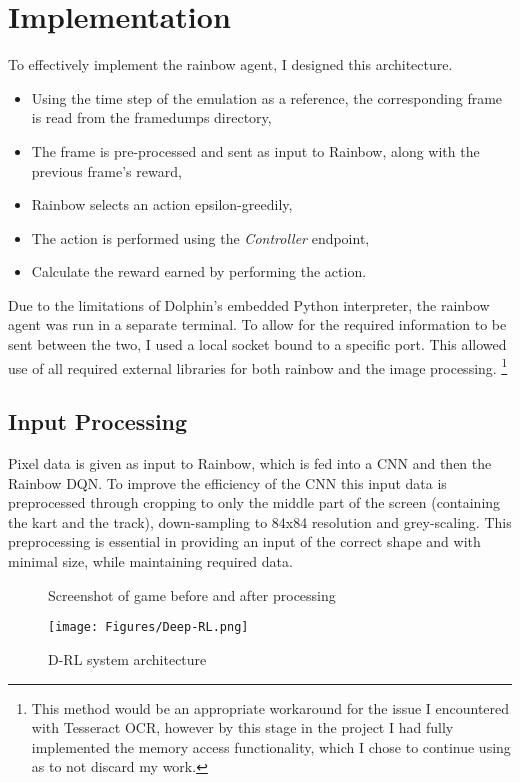 \section{Implementation}
To effectively implement the rainbow agent, I designed this architecture.
\begin{itemize}
    \item Using the time step of the emulation as a reference, the corresponding frame is read from the framedumps directory,
    \item The frame is pre-processed and sent as input to Rainbow, along with the previous frame's reward,
    \item Rainbow selects an action epsilon-greedily,
    \item The action is performed using the \textit{Controller} endpoint,
    \item Calculate the reward earned by performing the action.
\end{itemize}
Due to the limitations of Dolphin's embedded Python interpreter, the rainbow agent was run in a separate terminal. To allow for the required information to be sent between the two, I used a local socket bound to a specific port. This allowed use of all required external libraries for both rainbow and the image processing. \footnote{This method would be an appropriate workaround for the issue I encountered with Tesseract OCR, however by this stage in the project I had fully implemented the memory access functionality, which I chose to continue using as to not discard my work.}
\subsection{Input Processing}
Pixel data is given as input to Rainbow, which is fed into a CNN and then the Rainbow DQN. To improve the efficiency of the CNN this input data is preprocessed through cropping to only the middle part of the screen (containing the kart and the track), down-sampling to 84x84 resolution and grey-scaling. This preprocessing is essential in providing an input of the correct shape and with minimal size, while maintaining required data. 
\begin{figure}[hbt]
    \centering
    \hfill
    \caption{Screenshot of game before and after processing}
\end{figure}
\begin{figure}[hbt]
    \centering
    \texttt{[image: Figures/Deep-RL.png]}
    \caption{D-RL system architecture}
    \label{fig:rainbow-arch}
\end{figure}
